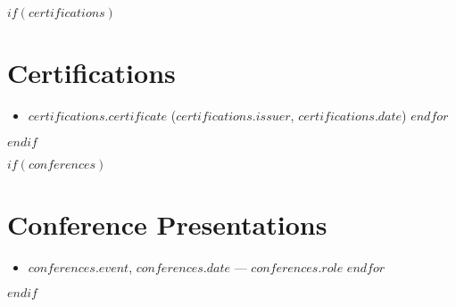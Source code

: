 \documentclass[11pt,a4paper]{article}
\begin{document}
$if(certifications)$
\section*{Certifications}
\begin{itemize}
  $for(certifications)$
  \item \textbf{$certifications.certificate$} (\emph{$certifications.issuer$}, $certifications.date$)
  $endfor$
\end{itemize}
$endif$

$if(conferences)$
\section*{Conference Presentations}
\begin{itemize}
  $for(conferences)$
  \item \textbf{$conferences.event$}, $conferences.date$ — \emph{$conferences.role$}
  $endfor$
\end{itemize}
$endif$
\end{document}
